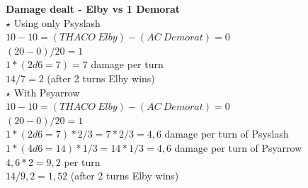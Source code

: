 \textbf{Damage dealt - Elby vs 1 Demorat}\\
\newline
$\star$ Using only Psyslash\\
$10-10 = (THACO\:Elby) - (AC\:Demorat) = 0$\\
$(20-0)/20 = 1$ \\
$1 * (2d6 = 7) = 7$ damage per turn\\
$14/ 7 = 2$ (after 2 turns Elby wins)\\
\newline
$\star$ With Psyarrow\\
$10-10 = (THACO\:Elby) - (AC\:Demorat) = 0$\\
$(20-0)/20 = 1$\\
$1 * (2d6 = 7) * 2/3 = 7 * 2/3 = 4,6$ damage per turn of Psyslash\\
$1 * (4d6 = 14) * 1/3 = 14 * 1/3 = 4,6$ damage per turn of Psyarrow\\
$4,6*2= 9,2$ per turn\\
$14 / 9,2 = 1,52$ (after 2 turns Elby wins)\\

\newpage


